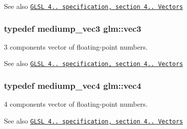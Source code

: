 \begin{DoxySeeAlso}{\-See also}
\href{http://www.opengl.org/registry/doc/GLSLangSpec.4.20.8.pdf}{\tt \-G\-L\-S\-L 4.. specification, section 4.. \-Vectors} 
\end{DoxySeeAlso}
\hypertarget{group__core__types_gad45787527c6ff2bd6680867204eb0354}{
\subsubsection[{vec3}]{\setlength{\rightskip}{0pt plus 5cm}typedef mediump\-\_\-vec3 {\bf glm\-::vec3}}}\label{group__core__types_gad45787527c6ff2bd6680867204eb0354}
3 components vector of floating-\/point numbers.

\begin{DoxySeeAlso}{\-See also}
\href{http://www.opengl.org/registry/doc/GLSLangSpec.4.20.8.pdf}{\tt \-G\-L\-S\-L 4.. specification, section 4.. \-Vectors} 
\end{DoxySeeAlso}
\hypertarget{group__core__types_gae9c89157f980f7247cdee8bf55787035}{
\subsubsection[{vec4}]{\setlength{\rightskip}{0pt plus 5cm}typedef mediump\-\_\-vec4 {\bf glm\-::vec4}}}\label{group__core__types_gae9c89157f980f7247cdee8bf55787035}
4 components vector of floating-\/point numbers.

\begin{DoxySeeAlso}{\-See also}
\href{http://www.opengl.org/registry/doc/GLSLangSpec.4.20.8.pdf}{\tt \-G\-L\-S\-L 4.. specification, section 4.. \-Vectors} 
\end{DoxySeeAlso}
